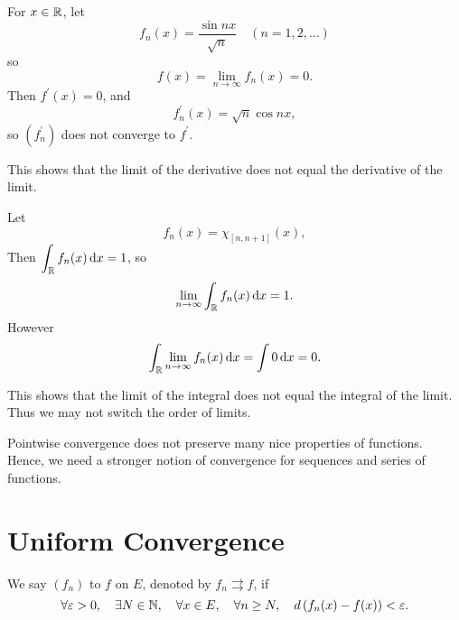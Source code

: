 \begin{example}[Differentiability]
For $x\in\mathbb R$, let
\[f_n(x)=\frac{\sin nx}{\sqrt{n}}\quad(n=1,2,\dots)\]
so
\[f(x)=\lim_{n\to\infty}f_n(x)=0.\]
Then $f^\prime(x)=0$, and
\[f_n^\prime(x)=\sqrt{n}\cos nx,\]
so $(f_n^\prime)$ does not converge to $f^\prime$. 
\end{example}

This shows that the limit of the derivative does not equal the derivative of the limit.

\begin{example}[Integrability]
Let
\[f_n(x)=\chi_{[n,n+1]}(x),\]
Then $\displaystyle\int_\mathbb R f_n(x)\dd{x}=1$, so
\[\lim_{n\to\infty}\int_\mathbb R f_n(x)\dd{x}=1.\]
However
\[\int_\mathbb R\lim_{n\to\infty}f_n(x)\dd{x}=\int 0\dd{x}=0.\]
\end{example}

This shows that the limit of the integral does not equal the integral of the limit. Thus we may not switch the order of limits.

\begin{comment}
\begin{example}[Integrability]
$f_n$ integrable, $f$ not integrable

Recall that the Dirichlet function
\[f(x)=\begin{cases}
1&(x\in\QQ)\\
0&(x\in\RR\setminus\QQ)
\end{cases}\]
is not integrable.

We define a sequence of functions as follows:
\[f_n(x)=\begin{cases}
1&\text{if }x=\frac{p}{q},p\in\ZZ,q\in\ZZ\setminus\{0\},|q|\le n\\
0&\text{if otherwise}
\end{cases}\]
\end{example}
\end{comment}

Pointwise convergence does not preserve many nice properties of functions. Hence, we need a stronger notion of convergence for sequences and series of functions.
\pagebreak

\section{Uniform Convergence}
\begin{definition}
We say $(f_n)$  to $f$ on $E$, denoted by $f_n\rightrightarrows f$, if 
\[\forall\varepsilon>0,\quad\exists N\in\mathbb N,\quad\forall x\in E,\quad\forall n\ge N,\quad d\left(f_n(x)-f(x)\right)<\varepsilon.\]
\end{definition}

